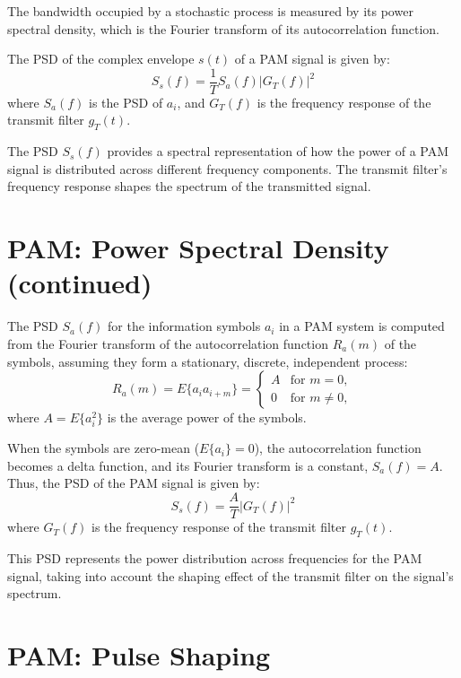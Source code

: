 The bandwidth occupied by a stochastic process is measured by its power spectral density, which is the Fourier transform of its autocorrelation function.

The PSD of the complex envelope \( s(t) \) of a PAM signal is given by:
\[ S_s(f) = \frac{1}{T} S_a(f) |G_T(f)|^2 \]
where \( S_a(f) \) is the PSD of \( a_i \), and \( G_T(f) \) is the frequency response of the transmit filter \( g_T(t) \).

The PSD \( S_s(f) \) provides a spectral representation of how the power of a PAM signal is distributed across different frequency components. The transmit filter's frequency response shapes the spectrum of the transmitted signal.


\section*{PAM: Power Spectral Density (continued)}

The PSD \( S_a(f) \) for the information symbols \( a_i \) in a PAM system is computed from the Fourier transform of the autocorrelation function \( R_a(m) \) of the symbols, assuming they form a stationary, discrete, independent process:
\[ R_a(m) = E\{a_i a_{i+m}\} = 
\begin{cases} 
A & \text{for } m = 0, \\
0 & \text{for } m \neq 0,
\end{cases} \]
where \( A = E\{a_i^2\} \) is the average power of the symbols.

When the symbols are zero-mean (\( E\{a_i\} = 0 \)), the autocorrelation function becomes a delta function, and its Fourier transform is a constant, \( S_a(f) = A \). Thus, the PSD of the PAM signal is given by:
\[ S_s(f) = \frac{A}{T} |G_T(f)|^2 \]
where \( G_T(f) \) is the frequency response of the transmit filter \( g_T(t) \).

This PSD represents the power distribution across frequencies for the PAM signal, taking into account the shaping effect of the transmit filter on the signal's spectrum.


\section*{PAM: Pulse Shaping}

